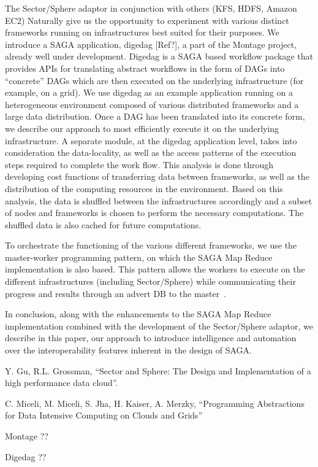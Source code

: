\documentclass[a4paper,11pt]{article}
\begin{document}
The Sector/Sphere adaptor in conjunction with others (KFS, HDFS, Amazon EC2)
Naturally give us the opportunity to experiment with various distinct frameworks running on infrastructures best suited for their purposes. We introduce a SAGA application, digedag [Ref?], a part of the Montage project, already well under development. Digedag is a SAGA based workflow package that provides APIs for translating abstract workflows in the form of DAGs into “concrete” DAGs which are then executed on the underlying infrastructure (for example, on a grid). We use digedag as an example application running on a heterogeneous environment composed of various distributed frameworks and a large data distribution. 
Once a DAG has been translated into its concrete form, we describe our approach to most efficiently execute it on the underlying infrastructure. A separate module, at the digedag application level, takes into consideration the data-locality, as well as the access patterns of the execution steps required to complete the work flow. This analysis is done through developing cost functions of transferring data between frameworks, as well as the distribution of the computing resources in the environment. Based on this analysis, the data is shuffled between the infrastructures accordingly and a subset of nodes and frameworks is chosen to perform the necessary computations. The shuffled data is also cached for future computations. 

To orchestrate the functioning of the various different frameworks, we use the master-worker programming pattern, on which the SAGA Map Reduce implementation is also based. This pattern allows the workers to execute on the different infrastructures (including Sector/Sphere) while communicating their progress and results through an advert DB to the master~\cite{sector}. 

In conclusion, along with the enhancements to the SAGA Map Reduce implementation combined with the development of the Sector/Sphere adaptor, we describe in this paper, our approach to introduce intelligence and automation over the interoperability features inherent in the design of SAGA.


\begin{thebibliography}{99}
\newblock Y. Gu, R.L. Grossman, “Sector and Sphere: The Design and Implementation of a high performance data cloud”. 

\newblock C. Miceli, M. Miceli, S. Jha, H. Kaiser, A. Merzky, “Programming Abstractions for Data Intensive Computing on Clouds and Grids”

\newblock Montage ??

\newblock Digedag ??

\end{thebibliography}
\end{document}
